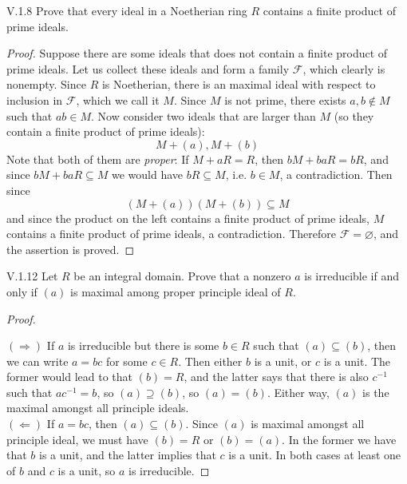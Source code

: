 \begin{problem}{V.1.8}
Prove that every ideal in a Noetherian ring $R$ contains a finite product of prime ideals. 
\end{problem}
\begin{proof}
Suppose there are some ideals that does not contain a finite product of prime ideals. Let us collect these ideals and form a family $\mathscr{F}$, which clearly is nonempty. Since $R$ is Noetherian, there is an maximal ideal with respect to inclusion in $\mathscr{F}$, which we call it $M$. Since $M$ is not prime, there exists $a,b \notin M$ such that $ab \in M$. Now consider two ideals that are larger than $M$ (so they contain a finite product of prime ideals):
\[
M + (a), M + (b)
\]
Note that both of them are \emph{proper}: If $M+aR = R$, then $bM + baR = bR$, and since $bM + baR \subseteq M$ we would have $bR \subseteq M$, i.e. $b \in M$, a contradiction. Then since
\[
(M+(a))(M+(b)) \subseteq M
\]
and since the product on the left contains a finite product of prime ideals, $M$ contains a finite product of prime ideals, a contradiction. Therefore $\mathscr{F} = \varnothing$, and the assertion is proved.
\end{proof}

\begin{problem}{V.1.12}
Let $R$ be an integral domain. Prove that a nonzero $a$ is irreducible if and only if $(a)$ is maximal among proper principle ideal of $R$.
\end{problem}
\begin{proof} \

\noindent $(\Rightarrow)$ If $a$ is irreducible but there is some $b \in R$ such that $(a) \subseteq (b)$, then we can write $a = bc$ for some $c \in R$. Then either $b$ is a unit, or $c$ is a unit. The former would lead to that $(b) = R$, and the latter says that there is also $c^{-1}$ such that $ac^{-1} = b$, so $(a)\supseteq (b)$, so $(a) = (b)$. Either way, $(a)$ is the maximal amongst all principle ideals. \\
$(\Leftarrow)$ If $a = bc$, then $(a) \subseteq (b)$. Since $(a)$ is maximal amongst all principle ideal, we must have $(b) = R$ or $(b) = (a)$. In the former we have that $b$ is a unit, and the latter implies that $c$ is a unit. In both cases at least one of $b$ and $c$ is a unit, so $a$ is irreducible. 
\end{proof}

